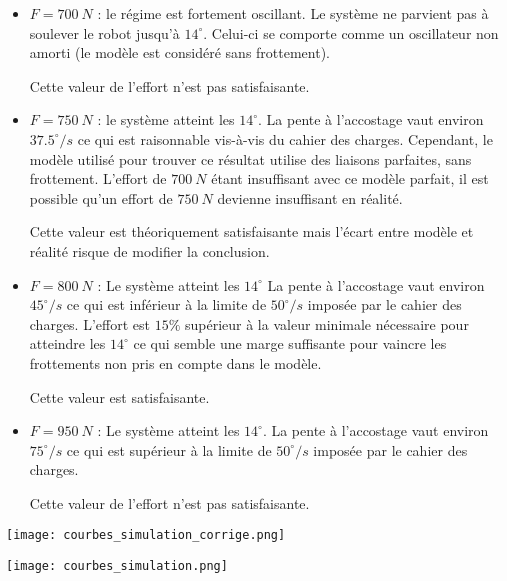 \ifprof
\begin{corrige}
\begin{itemize}
\item \textbf{$F=\SI{700}{N}$} : le régime est fortement oscillant. Le système ne parvient pas à soulever
le robot jusqu'à $14^{\circ}$. Celui-ci se comporte comme un oscillateur non
amorti (le modèle est considéré sans frottement).

Cette valeur de l'effort n'est pas satisfaisante.

\item \textbf{$F=\SI{750}{N}$} : le système atteint les $14^{\circ}$. La pente à l'accostage vaut environ $37.5^{\circ}/s$
ce qui est raisonnable vis-à-vis du cahier des charges. Cependant, le
modèle utilisé pour trouver ce résultat utilise des liaisons parfaites,
sans frottement. L'effort de $\SI{700}{N}$ étant insuffisant avec ce modèle
parfait, il est possible qu'un effort de $\SI{750}{N}$ devienne insuffisant en
réalité.

Cette valeur est théoriquement satisfaisante mais l'écart entre modèle
et réalité risque de modifier la conclusion.

\item \textbf{$F=\SI{800}{N}$} : Le système atteint les $14^{\circ}$ La pente à l'accostage vaut environ $45^{\circ}/s$ ce
qui est inférieur à la limite de $50^{\circ}/s$ imposée par le cahier des
charges. L'effort est $15\%$ supérieur à la valeur minimale nécessaire
pour atteindre les $14^{\circ}$ ce qui semble une marge suffisante pour vaincre
les frottements non pris en compte dans le modèle.

Cette valeur est satisfaisante.

\item \textbf{$F=\SI{950}{N}$} : Le système atteint les $14^{\circ}$. La pente à l'accostage vaut environ $75^{\circ}/s$ ce
qui est supérieur à la limite de $50^{\circ}/s$ imposée par le cahier des
charges.

Cette valeur de l'effort n'est pas satisfaisante.
\end{itemize}

\begin{center}
\texttt{[image: courbes\_simulation\_corrige.png]}
\end{center}

\end{corrige}
\else
\fi

\ifprof
\else

\begin{center}
\texttt{[image: courbes\_simulation.png]}
\end{center}
\fi

